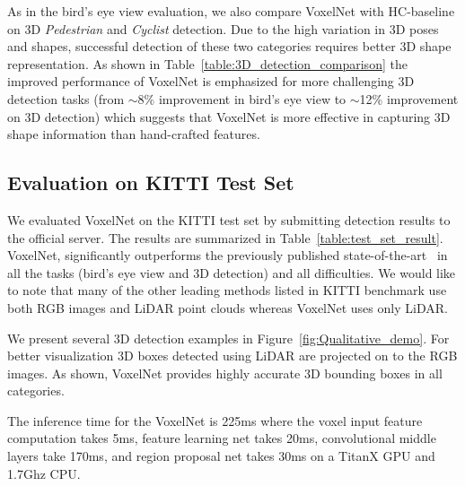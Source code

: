 \documentclass[10pt,twocolumn,letterpaper]{article}
\begin{document}
As in the bird's eye view evaluation, we also compare VoxelNet with HC-baseline on 3D \textit{Pedestrian} and \textit{Cyclist} detection. Due to the high variation in 3D poses and shapes, successful detection of these two categories requires better 3D shape representation. As shown in Table~\ref{table:3D_detection_comparison} the improved performance of VoxelNet is emphasized for more challenging 3D detection tasks (from $\sim$8\% improvement in bird's eye view to $\sim$12\% improvement on 3D detection) which suggests that VoxelNet is more effective in capturing 3D shape information than hand-crafted features.



\subsection{Evaluation on KITTI Test Set}

We evaluated VoxelNet on the KITTI test set by submitting detection results to the official server. The results are summarized in Table~\ref{table:test_set_result}. VoxelNet,  significantly outperforms the previously published state-of-the-art~\cite{REF:cvpr17chen}  in all the tasks (bird's eye view and 3D detection) and all difficulties. We would like to note that many of the other leading methods listed in KITTI benchmark  use both RGB images and LiDAR point clouds whereas VoxelNet  uses only LiDAR.






We present several 3D detection examples in Figure~\ref{fig:Qualitative_demo}. For better visualization  3D boxes detected using LiDAR are projected on to the RGB images. As shown, VoxelNet provides highly accurate 3D bounding boxes in all categories.



The inference time for the VoxelNet is 225ms where the voxel input feature computation takes 5ms, feature learning net takes 20ms, convolutional middle layers take 170ms, and region proposal net takes 30ms on a TitanX GPU and 1.7Ghz CPU.
\end{document}

